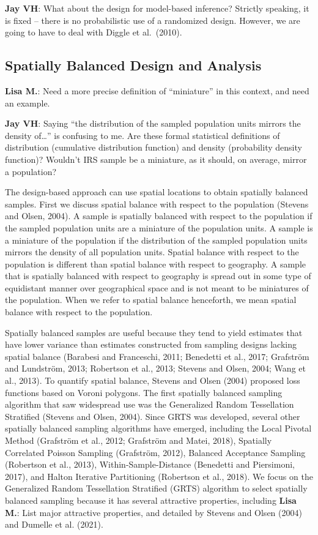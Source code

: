 \documentclass[]{elsarticle} %
\begin{document}
\textbf{Jay VH}: What about the design for model-based inference?
Strictly speaking, it is fixed -- there is no probabilistic use of a
randomized design. However, we are going to have to deal with Diggle et
al.~(2010).

\hypertarget{spatially-balanced-design-and-analysis}{%
\subsection{Spatially Balanced Design and
Analysis}\label{spatially-balanced-design-and-analysis}}

\textbf{Lisa M.}: Need a more precise definition of ``miniature'' in
this context, and need an example.

\textbf{Jay VH}: Saying ``the distribution of the sampled population
units mirrors the density of\ldots{}'' is confusing to me. Are these
formal statistical definitions of distribution (cumulative distribution
function) and density (probability density function)? Wouldn't IRS
sample be a miniature, as it should, on average, mirror a population?

The design-based approach can use spatial locations to obtain spatially
balanced samples. First we discuss spatial balance with respect to the
population (Stevens and Olsen, 2004). A sample is spatially balanced
with respect to the population if the sampled population units are a
miniature of the population units. A sample is a miniature of the
population if the distribution of the sampled population units mirrors
the density of all population units. Spatial balance with respect to the
population is different than spatial balance with respect to geography.
A sample that is spatially balanced with respect to geography is spread
out in some type of equidistant manner over geographical space and is
not meant to be miniatures of the population. When we refer to spatial
balance henceforth, we mean spatial balance with respect to the
population.

Spatially balanced samples are useful because they tend to yield
estimates that have lower variance than estimates constructed from
sampling designs lacking spatial balance (Barabesi and Franceschi, 2011;
Benedetti et al., 2017; Grafström and Lundström, 2013; Robertson et al.,
2013; Stevens and Olsen, 2004; Wang et al., 2013). To quantify spatial
balance, Stevens and Olsen (2004) proposed loss functions based on
Voroni polygons. The first spatially balanced sampling algorithm that
saw widespread use was the Generalized Random Tessellation Stratified
(Stevens and Olsen, 2004). Since GRTS was developed, several other
spatially balanced sampling algorithms have emerged, including the Local
Pivotal Method (Grafström et al., 2012; Grafström and Matei, 2018),
Spatially Correlated Poisson Sampling (Grafström, 2012), Balanced
Acceptance Sampling (Robertson et al., 2013), Within-Sample-Distance
(Benedetti and Piersimoni, 2017), and Halton Iterative Partitioning
(Robertson et al., 2018). We focus on the Generalized Random
Tessellation Stratified (GRTS) algorithm to select spatially balanced
sampling because it has several attractive properties, including
\textbf{Lisa M.}: List major attractive properties, and detailed by
Stevens and Olsen (2004) and Dumelle et al. (2021).
\end{document}
